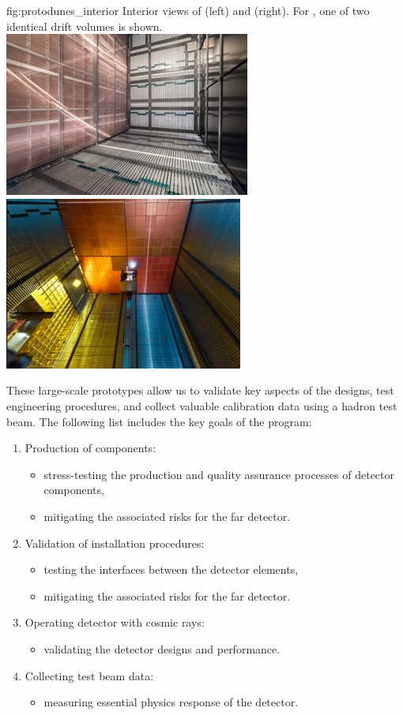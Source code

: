 \begin{dunefigure}
{fig:protodunes_interior}
{Interior views of  (left) and  (right). For , one of two identical drift volumes is shown.}
\includegraphics[width=0.46\linewidth]{graphics/ProtoDUNE-sp-interior.jpg}\hspace{0.05\linewidth}
\includegraphics[width=0.44\linewidth]{graphics/protodune-dp-interior.jpg}
\end{dunefigure}

These large-scale prototypes allow us to validate key aspects of the  designs, test engineering procedures, and collect valuable calibration data using a hadron test beam. The following list includes the key goals of the  program:
\begin{enumerate}
\item Production of components:
\begin{itemize}
\item stress-testing the production and quality
assurance processes of detector components,
\item mitigating the associated risks for the far detector.
\end{itemize}
\item Validation of installation procedures:
\begin{itemize}
\item testing the interfaces between the detector elements,
\item mitigating the associated risks for the far detector.
\end{itemize}
\item Operating detector with cosmic rays:
\begin{itemize}
\item validating the detector designs and
performance.
\end{itemize}
\item Collecting test beam data:
\begin{itemize}
\item measuring essential physics response of the detector.
\end{itemize}
\end{enumerate}


